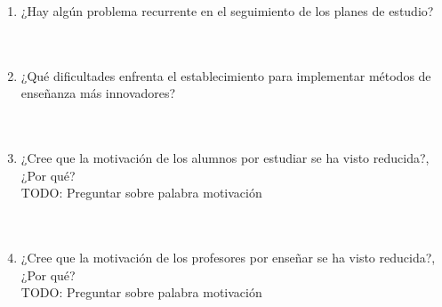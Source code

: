 \documentclass{article}
\begin{document}
\begin{enumerate}
        \underline{\hspace{0.95\linewidth}} \vspace{0.3cm}
    \item ¿Hay algún problema recurrente en el seguimiento de los planes de estudio? \\[0.5cm]
        \underline{\hspace{0.95\linewidth}} \vspace{0.3cm} \\
        \underline{\hspace{0.95\linewidth}} \vspace{0.3cm} \\
        \underline{\hspace{0.95\linewidth}} \vspace{0.3cm}
    \item ¿Qué dificultades enfrenta el establecimiento para implementar métodos de enseñanza más innovadores? \\[0.5cm]
        \underline{\hspace{0.95\linewidth}} \vspace{0.3cm} \\
        \underline{\hspace{0.95\linewidth}} \vspace{0.3cm} \\
        \underline{\hspace{0.95\linewidth}} \vspace{0.3cm}
    \item ¿Cree que la motivación de los alumnos por estudiar se ha visto reducida?, ¿Por qué? \\ TODO: Preguntar sobre palabra motivación \\[0.5cm]
        \underline{\hspace{0.95\linewidth}} \vspace{0.3cm} \\
        \underline{\hspace{0.95\linewidth}} \vspace{0.3cm} \\
        \underline{\hspace{0.95\linewidth}} \vspace{0.3cm}
    \item ¿Cree que la motivación de los profesores por enseñar se ha visto reducida?, ¿Por qué? \\ TODO: Preguntar sobre palabra motivación \\[0.5cm]
        \underline{\hspace{0.95\linewidth}} \vspace{0.3cm} \\

\end{enumerate}
\end{document}
